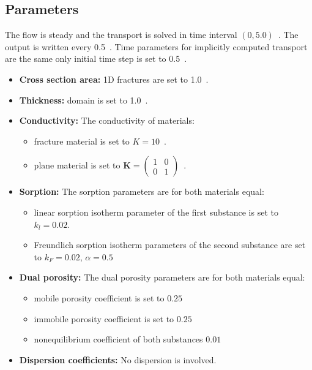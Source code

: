 \subsection*{Parameters}
The flow is steady and the transport is solved in time interval $(0,5.0)$~. The output is written every 0.5~. 
Time parameters for implicitly computed transport are the same only initial time step is set to 0.5~.
\begin{itemize}
  \item \textbf{Cross section area:} 1D fractures are set to 1.0~.
  \item \textbf{Thickness:} domain is set to 1.0~.
  \item \textbf{Conductivity:} The conductivity of materials:
    \begin{itemize}
      \item fracture material is set to $K=10$~.
      \item plane material is set to $\mathbf{K}=\left(\begin{array}{cc} 1 & 0 \\ 0 & 1\end{array} \right)$~.
    \end{itemize}
  \item \textbf{Sorption:} The sorption parameters are for both materials equal:
    \begin{itemize}
      \item linear sorption isotherm parameter of the first substance is set to $k_l=0.02$.
      \item Freundlich sorption isotherm parameters of the second substance are set to $k_F=0.02$, $\alpha=0.5$  
    \end{itemize}
  \item \textbf{Dual porosity:} The dual porosity parameters are for both materials equal:
    \begin{itemize}
      \item mobile porosity coefficient is set to $0.25$
      \item immobile porosity coefficient is set to $0.25$
      \item nonequilibrium coefficient of both substances $0.01$
    \end{itemize}
  \item \textbf{Dispersion coefficients:} No dispersion is involved.
\end{itemize}

